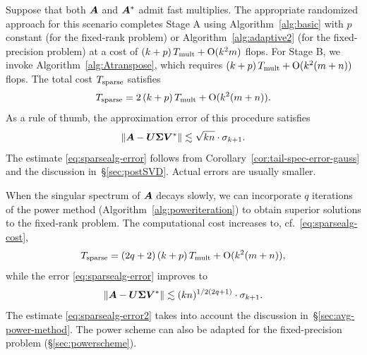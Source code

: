 \documentclass{article}
\begin{document}
Suppose that both $\bm{A}$ and $\bm{A}^*$ admit fast multiplies.
The appropriate randomized approach for this scenario completes
Stage A using Algorithm~\ref{alg:basic} with $p$ constant
(for the fixed-rank problem)
or Algorithm~\ref{alg:adaptive2} (for the fixed-precision problem)
at a cost of  $(k+p) \, T_{\rm mult} + \mathrm{O}(k^2 m)$ flops.
For Stage B, we invoke Algorithm~\ref{alg:Atranspose}, which
requires $(k+p) \, T_{\rm mult} + \mathrm{O}(k^2 (m + n))$ flops.
The total cost $T_{\rm sparse}$ satisfies
\begin{equation}
\label{eq:sparsealg-cost}
T_{\rm sparse} = 2\,(k + p)\, T_{\rm mult} + \mathrm{O}(k^2 (m + n)).
\end{equation}
As a rule of thumb, the approximation error of this procedure satisfies
\begin{equation}
\label{eq:sparsealg-error}
\left\Vert { \bm{A} - \bm{U\Sigma V}^*} \right\Vert \lesssim \sqrt{kn} \cdot \sigma_{k+1}.
\end{equation}
The estimate \eqref{eq:sparsealg-error} follows from Corollary~\ref{cor:tail-spec-error-gauss}
and the discussion in~\S\ref{sec:postSVD}.  Actual errors are usually smaller.

When the singular spectrum of $\bm{A}$ decays slowly,
we can incorporate $q$ iterations of the power method
(Algorithm~\ref{alg:poweriteration}) to obtain superior
solutions to the fixed-rank problem.
The computational cost increases to, cf.~\eqref{eq:sparsealg-cost},
\begin{equation}
\label{eq:sparsealg-cost2}
T_{\rm sparse} = (2q+2)\,(k + p) \, T_{\rm mult} + \mathrm{O}(k^2 (m + n)),
\end{equation}
while the error \eqref{eq:sparsealg-error} improves to
\begin{equation}
\label{eq:sparsealg-error2}
\left\Vert { \bm{A} - \bm{U\Sigma V}^*} \right\Vert \lesssim (kn)^{1/2(2q+1)} \cdot \sigma_{k+1}.
\end{equation}
The estimate \eqref{eq:sparsealg-error2}
takes into account the discussion in~\S\ref{sec:avg-power-method}.
The power scheme can also be adapted for the fixed-precision
problem (\S\ref{sec:powerscheme}).
\end{document}
